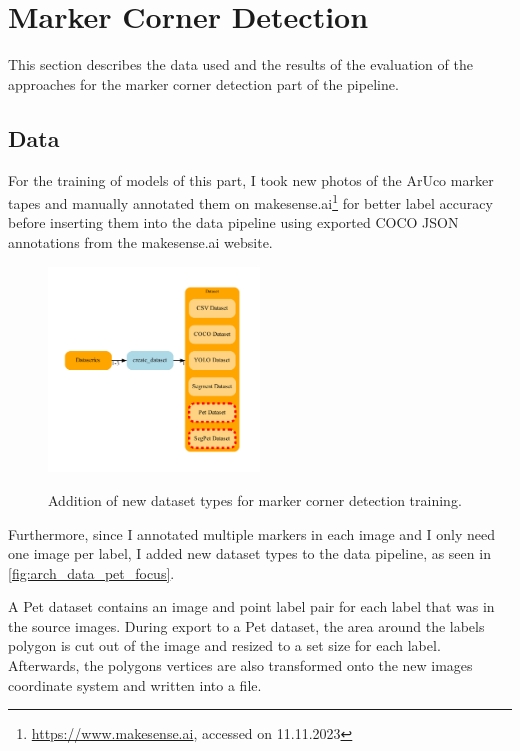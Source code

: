 \documentclass[10pt]{book}
\newcommand{\figureref}[1]{\autoref{#1}}
\begin{document}
\section{Marker Corner Detection}

This section describes the data used and the results of the evaluation of the approaches for the marker corner detection part of the pipeline.

\subsection{Data}

For the training of models of this part, I took new photos of the \ac{ArUco} marker tapes and manually annotated them on makesense.ai\footnote{\url{https://www.makesense.ai}, accessed on 11.11.2023} for better label accuracy before inserting them into the data pipeline using exported \ac{COCO} \ac{JSON} annotations from the makesense.ai website.

\begin{figure}
  \caption{Addition of new dataset types for marker corner detection training.}
  \includegraphics[width=0.5\textwidth]{graph/arch_data_pet_focus}
  \label{fig:arch_data_pet_focus}
\end{figure}

Furthermore, since I annotated multiple markers in each image and I only need one image per label, I added new dataset types to the data pipeline, as seen in \figureref{fig:arch_data_pet_focus}. 

A Pet dataset contains an image and point label pair for each label that was in the source images. During export to a Pet dataset, the area around the labels polygon is cut out of the image and resized to a set size for each label. Afterwards, the polygons vertices are also transformed onto the new images coordinate system and written into a file. 
\end{document}
